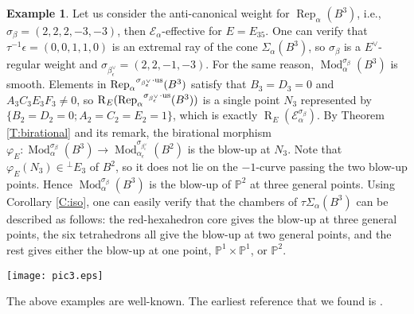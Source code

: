 \documentclass{amsart}
\theoremstyle{definition}
\newtheorem{example}[theorem]{Example}
\theoremstyle{remark}
\numberwithin{equation}{section}
\begin{document}
\begin{example}
Let us consider the anti-canonical weight for ${\operatorname{Rep}}_\alpha(B^3)$, i.e., $\sigma_\beta=(2,2,2,-3,-3)$, then ${\mathcal{{E}}}_\alpha$-effective for $E=E_{35}$. One can verify that $\tau^{-1}\epsilon=(0,0,1,1,0)$ is an extremal ray of the cone $\Sigma_\alpha(B^3)$, so $\sigma_\beta$ is a $E^\vee$-regular weight and $\sigma_{\beta_\epsilon^\vee}=(2,2,-1,-3)$. For the same reason, ${\operatorname{Mod}}_\alpha^{\sigma_\beta}(B^3)$ is smooth. Elements in ${\operatorname{Rep}}_\alpha{^{\sigma_{{\beta_\epsilon^\vee}}\cdot{\rm {us}}}}(B^3)$ satisfy that $B_3=D_3=0$ and $A_3C_3E_3F_3\neq 0$, so ${\operatorname{R}}_E({\operatorname{Rep}}_\alpha{^{\sigma_{{\beta_\epsilon^\vee}}\cdot{\rm {us}}}}(B^3))$ is a single point $N_3$ represented by $\{B_2=D_2=0; A_2=C_2=E_2=1\}$, which is exactly ${\operatorname{R}}_E({\mathcal{{E}}}_\alpha^{\sigma_\beta})$. By Theorem \ref{T:birational} and its remark, the birational morphism $\varphi_E: {\operatorname{Mod}}_\alpha^{\sigma_\beta}(B^3)\to {\operatorname{Mod}}_{\alpha_\epsilon}^{\sigma_{\beta_\epsilon^\vee}}(B^2)$ is the blow-up at $N_3$.  Note that $\varphi_E(N_3)\in{{^\perp}\!} E_3$ of $B^2$, so it does not lie on the $-1$-curve passing the two blow-up points. Hence ${\operatorname{Mod}}_\alpha^{\sigma_\beta}(B^3)$ is the blow-up of ${\mathbb{{P}}}^2$ at three general points. Using Corollary \ref{C:iso}, one can easily verify that the chambers of $\tau\Sigma_\alpha(B^3)$ can be described as follows:
the red-hexahedron core gives the blow-up at three general points, the six tetrahedrons all give the blow-up at two general points, and the rest gives either the blow-up at one point, ${\mathbb{{P}}}^1\times{\mathbb{{P}}}^1$, or ${\mathbb{{P}}}^2$.

\begin{center}
\texttt{[image: pic3.eps]}
\end{center}

The above examples are well-known. The earliest reference that we found is \cite{Hi}.


\end{example}
\end{document}
